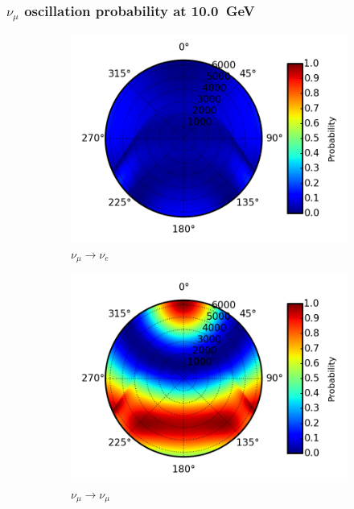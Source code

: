 \documentclass{beamer}
\begin{document}
\begin{frame}
	\frametitle{$\nu_{\mu}$ oscillation probability at \SI{10.0}{GeV}}
	\begin{figure}
		\centering
		\begin{subfigure}[b]{0.33\linewidth}
			\caption{ $\nu_{\mu} \rightarrow \nu_{e}$ }
			\includegraphics[width=\linewidth]{earth_10.0gev_numu2nue_throughEarth.png}
		\end{subfigure}
		\begin{subfigure}[b]{0.33\linewidth}
			\caption{ $\nu_{\mu} \rightarrow \nu_{\mu}$ }
			\includegraphics[width=\linewidth]{earth_10.0gev_numu2numu_throughEarth.png}
		\end{subfigure}
		\begin{subfigure}[b]{0.33\linewidth}

\end{subfigure}
\end{figure}
\end{frame}
\end{document}
